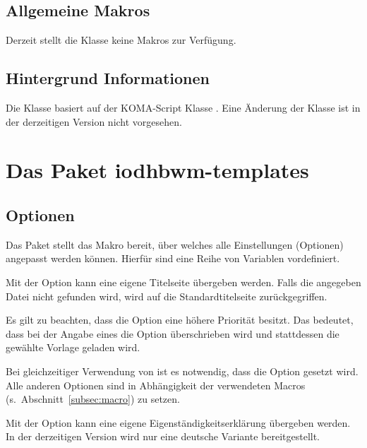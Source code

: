 \documentclass[babel=ngerman,highlight=false]{skdoc}
\begin{document}
        \subsection{Allgemeine Makros}
            Derzeit stellt die Klasse keine Makros zur Verfügung.

        \subsection{Hintergrund Informationen}
            Die Klasse basiert auf der KOMA-Script Klasse . Eine Änderung der Klasse ist in der derzeitigen Version \theversion{} nicht vorgesehen.

    \section{Das Paket iodhbwm-templates}\label{pkg:iodhbwm-templates}
        \subsection{Optionen}\label{pkg:options}
            Das Paket stellt das Makro \Macro{} bereit, über welches alle Einstellungen (Optionen) angepasst werden können. Hierfür sind eine Reihe von  Variablen vordefiniert.\medskip

            Mit der Option kann eine eigene Titelseite übergeben werden. Falls die angegeben Datei nicht gefunden wird, wird auf die Standardtitelseite zurückgegriffen.

            Es gilt zu beachten, dass die Option  eine höhere Priorität besitzt. Das bedeutet, dass bei der Angabe eines  die Option  überschrieben wird und stattdessen die gewählte Vorlage geladen wird.

            Bei gleichzeitiger Verwendung von  ist es notwendig, dass die Option  gesetzt wird. Alle anderen Optionen sind in Abhängigkeit der verwendeten Macros (s.~Abschnitt~\ref{subsec:macro}) zu setzen.\medskip

            Mit der Option kann eine eigene Eigenständigkeitserklärung übergeben werden. In der derzeitigen Version wird nur eine deutsche Variante bereitgestellt.\medskip
\end{document}
